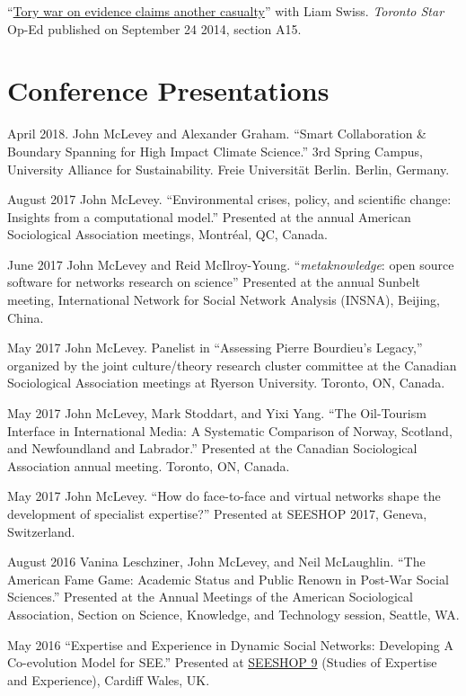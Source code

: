 \ind ``\href{http://bit.ly/1ohSn1N}{Tory war on evidence claims another
casualty}'' with Liam Swiss. \emph{Toronto Star} Op-Ed published on
September 24 2014, section A15.

\section{Conference Presentations}\label{conference-presentations}

\ind April 2018. John McLevey and Alexander Graham. ``Smart
Collaboration \& Boundary Spanning for High Impact Climate Science.''
3rd Spring Campus, University Alliance for Sustainability. Freie
Universität Berlin. Berlin, Germany.

\ind August 2017 John McLevey. ``Environmental crises, policy, and
scientific change: Insights from a computational model.'' Presented at
the annual American Sociological Association meetings, Montréal, QC,
Canada.

\ind June 2017 John McLevey and Reid McIlroy-Young.
``\emph{metaknowledge}: open source software for networks research on
science'' Presented at the annual Sunbelt meeting, International Network
for Social Network Analysis (INSNA), Beijing, China.

\ind May 2017 John McLevey. Panelist in ``Assessing Pierre Bourdieu's
Legacy,'' organized by the joint culture/theory research cluster
committee at the Canadian Sociological Association meetings at Ryerson
University. Toronto, ON, Canada.

\ind May 2017 John McLevey, Mark Stoddart, and Yixi Yang. ``The
Oil-Tourism Interface in International Media: A Systematic Comparison of
Norway, Scotland, and Newfoundland and Labrador.'' Presented at the
Canadian Sociological Association annual meeting. Toronto, ON, Canada.

\ind May 2017 John McLevey. ``How do face-to-face and virtual networks
shape the development of specialist expertise?'' Presented at SEESHOP
2017, Geneva, Switzerland.

\ind August 2016 Vanina Leschziner, John McLevey, and Neil McLaughlin.
``The American Fame Game: Academic Status and Public Renown in Post-War
Social Sciences.'' Presented at the Annual Meetings of the American
Sociological Association, Section on Science, Knowledge, and Technology
session, Seattle, WA.

\ind May 2016 ``Expertise and Experience in Dynamic Social Networks:
Developing A Co-evolution Model for SEE.'' Presented at
\href{http://www.cf.ac.uk/socsi/contactsandpeople/harrycollins/expertise-project/seeshophome.html}{SEESHOP
9} (Studies of Expertise and Experience), Cardiff Wales, UK.

